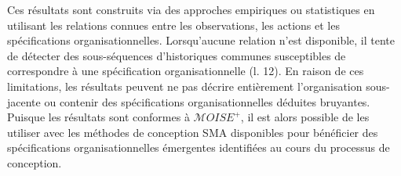\documentclass[contribution]{jfsma}
\newcounter{relation}
\begin{document}
Ces résultats sont construits via des approches empiriques ou statistiques en utilisant les relations connues entre les observations, les actions et les spécifications organisationnelles. Lorsqu'aucune relation n'est disponible, il tente de détecter des sous-séquences d'historiques communes susceptibles de correspondre à une spécification organisationnelle (l. 12). En raison de ces limitations, les résultats peuvent ne pas décrire entièrement l’organisation sous-jacente ou contenir des spécifications organisationnelles déduites bruyantes. Puisque les résultats sont conformes à $\mathcal{M}OISE^+$, il est alors possible de les utiliser avec les méthodes de conception SMA disponibles pour bénéficier des spécifications organisationnelles émergentes identifiées au cours du processus de conception.



\end{document}
